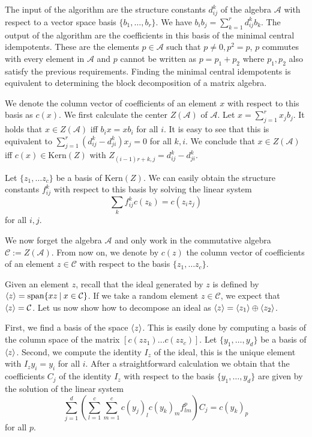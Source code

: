 \documentclass[12 pt]{article}
\begin{document}
The input of the algorithm are the structure constants $d_{ij}^k$ of the algebra $\mathcal{A}$ with respect to a vector space basis $\{b_1,\dots,b_r\}$. We have $b_ib_j=\sum_{k=1}^rd_{ij}^kb_k$. The output of the algorithm are the coefficients in this basis of the minimal central idempotents. These are the elements $p  \in \mathcal{A}$ such that $p\neq 0, p^2=p$, $p$ commutes with every element in $\mathcal{A}$ and $p$ cannot be written as $p=p_1+p_2$ where $p_1,p_2$ also satisfy the previous requirements. Finding the minimal central idempotents is equivalent to determining the block decomposition of a matrix algebra.


We denote the column vector of coefficients of an element $x$ with respect to this basis as $c(x)$. We first calculate the center $Z(\mathcal{A})$ of $\mathcal{A}$. Let $x = \sum_{j=1}^r x_jb_j$. It holds that $x\in Z(\mathcal{A})$ iff $b_ix=xb_i$ for all $i$. It is easy to see that this is equivalent to $\sum_{j=1}^r(d_{ij}^k-d_{ji}^k)x_j=0$ for all $k,i$. We conclude that $x \in Z(\mathcal{A})$ iff $c(x) \in \text{Kern}(Z)$ with $Z_{(i-1)r+k,j}=d_{ij}^k-d_{ji}^k$.

Let $\{z_1,\ldots z_c\}$ be a basis of $\text{Kern}(Z)$. We can easily obtain the structure constants $f_{ij}^k$ with respect to this basis by solving the linear system
$$
\sum_k f_{ij}^k c(z_k) = c(z_iz_j)
$$
for all $i,j$.

We now forget the algebra $\mathcal{A}$ and only work in the commutative algebra $\mathcal{C}:=Z(\mathcal{A})$. From now on, we denote by $c(z)$  the column vector of coefficients of an element $z\in \mathcal{C}$ with respect to the basis $\{z_1,\ldots z_c\}$.

Given an element $z$, recall that the ideal generated by $z$ is defined by $\braket{z}=\text{span}\{xz \: | \: x \in \mathcal{C}\}$. If we take a random element $z \in \mathcal{C}$, we expect that $\braket{z}=\mathcal{C}$. Let us now show how to decompose an ideal as $\braket{z} = \braket{z_1} \oplus \braket{z_2}$.

First, we find a basis of the space $\braket{z}$. This is easily done by computing a basis of the column space of the matrix $[c(zz_1) \dots c(zz_c)]$. Let $\{y_1,\ldots, y_d\}$ be a basis of $\braket{z}$. Second, we compute the identity $I_z$ of the ideal, this is the unique element with $I_{z}y_i=y_i$ for all $i$. After a straightforward calculation we obtain that the coefficients $C_j$ of the identity $I_z$ with respect to the basis $\{y_1,\dots,y_d\}$ are given by the solution of the linear system
$$
\sum_{j=1}^d\left(\sum_{l=1}^c\sum_{m=1}^cc(y_j)_lc(y_k)_m f_{lm}^p\right)C_j = c(y_k)_p
$$
for all $p$.
\end{document}
